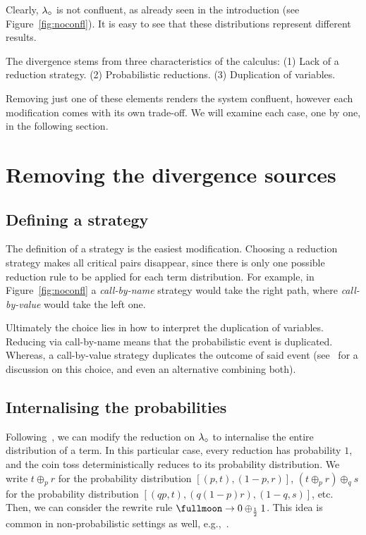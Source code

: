 Clearly, $\lambda_{\circ}$ is not confluent, as already seen in the introduction (see Figure~\ref{fig:noconfl}). It is easy to see that these distributions represent different results.

The divergence stems from three characteristics of the calculus:
  (1) Lack of a reduction strategy.
  (2) Probabilistic reductions.
  (3) Duplication of variables.

Removing just one of these elements renders the system confluent, however each modification comes with its own trade-off. We will examine each case, one by one, in the following section.

\section{Removing the divergence sources}
\subsection{Defining a strategy}\label{sec:strategy}
The definition of a strategy is the easiest modification. Choosing a reduction strategy makes all critical pairs disappear, since there is only one possible reduction rule to be applied for each term distribution. For example, in Figure~\ref{fig:noconfl} a \textit{call-by-name} strategy would take the right path, where \textit{call-by-value} would take the left one. 

Ultimately the choice lies in how to interpret the duplication of variables. Reducing via call-by-name means that the probabilistic event is duplicated. Whereas, a call-by-value strategy duplicates the outcome of said event (see~\cite{Dallago} for a discussion on this choice, and even an alternative combining both).

\subsection{Internalising the probabilities}\label{sec:circulito}
Following~\cite{lambdarho}, we can modify the reduction on $\lambda_{\circ}$ to internalise the entire distribution of a term. In this particular case, every reduction has probability $1$, and the coin toss deterministically reduces to its probability distribution.
We write $t\oplus_{p}r$ for the probability distribution $[(p,t),(1-p,r)]$, $(t\oplus_p r)\oplus_q s$ for the probability distribution $[(qp,t),(q(1-p)r),(1-q,s)]$, etc. Then, we can consider the rewrite rule
\(
  \coin\to 0 \oplus_{\frac 12} 1
\).
This idea is common in non-probabilistic settings as well, e.g.,~\cite{AlvesDunduaFloridoKutsiaIGPL18}.

